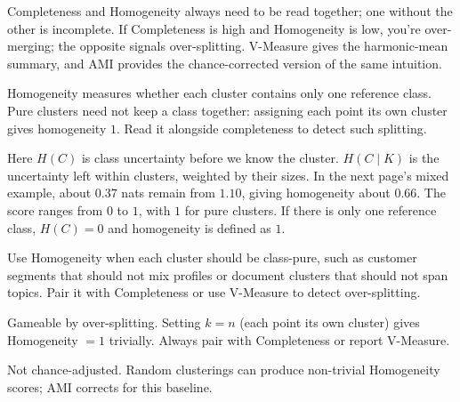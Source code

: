 \metricsecondary

Completeness and Homogeneity always need to be read together; one without the other is incomplete. If Completeness is high and Homogeneity is low, you're over-merging; the opposite signals over-splitting. V-Measure gives the harmonic-mean summary, and AMI provides the chance-corrected version of the same intuition.

\metricend
\clearpage
\thispagestyle{clusteringstyle}
\label{sec:homogeneity-score}

Homogeneity measures whether each cluster contains only one reference class. Pure clusters need not keep a class together: assigning each point its own cluster gives homogeneity $1$. Read it alongside completeness to detect such splitting.

\begin{metricformula}
\end{metricformula}

Here $H(C)$ is class uncertainty before we know the cluster. $H(C \mid K)$ is the uncertainty left within clusters, weighted by their sizes. In the next page's mixed example, about $0.37$ nats remain from $1.10$, giving homogeneity about $0.66$. The score ranges from $0$ to $1$, with $1$ for pure clusters. If there is only one reference class, $H(C)=0$ and homogeneity is defined as $1$.


Use Homogeneity when each cluster should be class-pure, such as customer segments that should not mix profiles or document clusters that should not span topics. Pair it with Completeness or use V-Measure to detect over-splitting.


{
    \item Gameable by over-splitting. Setting $k = n$ (each point its own cluster) gives Homogeneity $= 1$ trivially. Always pair with Completeness or report V-Measure.
    \item Not chance-adjusted. Random clusterings can produce non-trivial Homogeneity scores; AMI corrects for this baseline.
}


